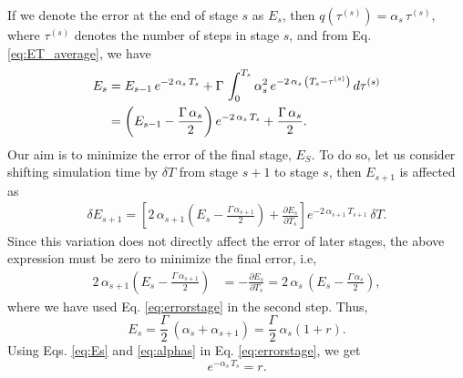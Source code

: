 \documentclass[reprint, floatfix]{revtex4-1}
\begin{document}
If we denote the error at the end of stage $s$ as $E_s$,
then $q\left( \tau^{(s)} \right) = \alpha_s \, \tau^{(s)}$,
where $\tau^{(s)}$ denotes the number of steps in stage $s$,
and from Eq. \eqref{eq:ET_average}, we have
%
\begin{align}
  E_s
  &=
  E_{s - 1} \, e^{-2 \, \alpha_s \, T_s }
  +
  \Gamma \, \int_0^{T_s}
  \alpha_s^2 \,
  e^{ -2 \, \alpha_s \, \left(T_s - \tau^{(s)}\right) }
  \, d \tau^{(s)}
  \notag
  \\
  &=
  \left(
    E_{s - 1} - \frac{ \Gamma \, \alpha_s } { 2 }
  \right)
  e^{ - 2 \, \alpha_s \, T_s }
  +
  \frac{ \Gamma \, \alpha_s } { 2 }
  .
  \label{eq:errorstage}
\end{align}
%
Our aim is to minimize the error
of the final stage, $E_S$.
%
To do so, let us consider shifting simulation time
by $\delta T$ from
stage $s+1$ to stage $s$,
then $E_{s+1}$ is affected as
%
\begin{align*}
  \delta E_{s+1}
  =
\left[
  2 \, \alpha_{s+1}
  \left(
    E_s - \tfrac{ \Gamma \, \alpha_{s+1} } { 2 }
  \right)
  +
  \frac{ \partial E_s } { \partial T_s }
\right]
e^{-2 \, \alpha_{s+1} \, T_{s+1} }
\,
\delta T
.
\end{align*}
%
Since this variation does not directly affect the error of later stages,
the above expression must be zero to minimize the final error, i.e,
%
\begin{align*}
  2 \, \alpha_{s+1}
  \left(
    E_s - \frac{ \Gamma \, \alpha_{s+1} } { 2 }
  \right)
  &=
  -\frac{ \partial E_s } { \partial T_s }
  =
  2 \, \alpha_s \, \left(E_s - \frac{ \Gamma \, \alpha_s } { 2 }  \right)
  ,
\end{align*}
%
where we have used Eq. \eqref{eq:errorstage}
in the second step.
%
Thus,
\begin{equation}
  E_s
  =
  \frac{ \Gamma } { 2 } \, ( \alpha_s + \alpha_{s+1} )
  =
  \frac{ \Gamma } { 2 } \, \alpha_s ( 1 + r )
  .
  \label{eq:Es}
\end{equation}
%
Using Eqs. \eqref{eq:Es} and \eqref{eq:alphas}
in Eq. \eqref{eq:errorstage}, we get
%
\begin{equation}
  e^{-\alpha_s \, T_s } = r
  .
  \label{eq:exp_r}
\end{equation}
%
\end{document}

